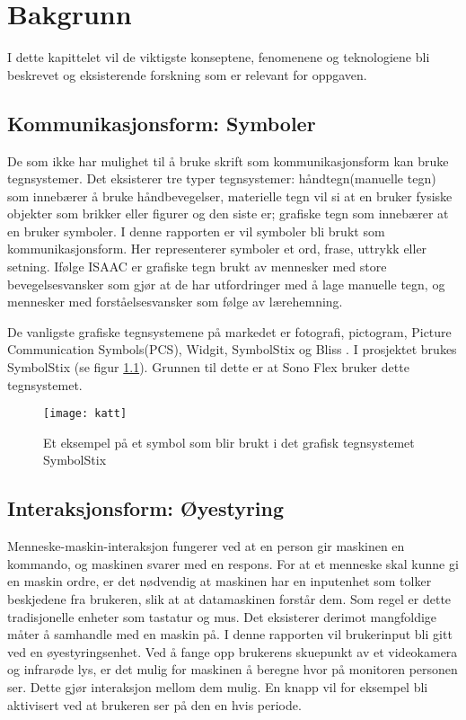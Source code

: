 
\chapter{Bakgrunn}

I dette kapittelet vil de viktigste konseptene, fenomenene og teknologiene bli beskrevet og eksisterende  forskning som er relevant for oppgaven. 

\section{Kommunikasjonsform: Symboler}

De som ikke har mulighet til å bruke skrift som kommunikasjonsform kan bruke tegnsystemer. Det eksisterer tre typer tegnsystemer: håndtegn(manuelle tegn) som innebærer å bruke håndbevegelser, materielle tegn vil si at en bruker fysiske objekter som brikker eller figurer og den siste er; grafiske tegn som innebærer at en bruker symboler. I denne rapporten er vil symboler bli brukt som kommunikasjonsform. Her representerer symboler et ord, frase, uttrykk eller setning. Ifølge ISAAC \cite{Tegnsystemer} er grafiske tegn brukt av mennesker med store bevegelsesvansker som gjør at de har utfordringer med å lage manuelle tegn, og mennesker med forståelsesvansker som følge av lærehemning.

De vanligste grafiske tegnsystemene på markedet er fotografi, pictogram, Picture Communication Symbols(PCS), Widgit, SymbolStix og Bliss \cite{GrafiskTegn}. I prosjektet brukes SymbolStix (se figur \ref{fig:katt}). Grunnen til dette er at Sono Flex bruker dette tegnsystemet.


\begin{figure}[ht!]
\centering
\texttt{[image: katt]}
\caption{Et eksempel på et symbol som blir brukt i det grafisk tegnsystemet SymbolStix}
\label{fig:katt}
\end{figure}

\section{Interaksjonsform: Øyestyring}

Menneske-maskin-interaksjon fungerer ved at en person gir maskinen en kommando, og maskinen svarer med en respons. For at et menneske skal kunne gi en maskin ordre, er det nødvendig at maskinen har en inputenhet som tolker beskjedene fra brukeren, slik at at datamaskinen forstår dem.  Som regel er dette tradisjonelle enheter som tastatur og mus. Det eksisterer derimot mangfoldige måter å samhandle med en maskin på. I denne rapporten vil brukerinput bli gitt ved en øyestyringsenhet.  Ved å fange opp brukerens skuepunkt av et videokamera og infrarøde lys, er det mulig for maskinen å beregne hvor på monitoren personen ser. Dette gjør interaksjon mellom dem mulig. En knapp vil for eksempel bli aktivisert ved at brukeren ser på den en hvis periode. 




